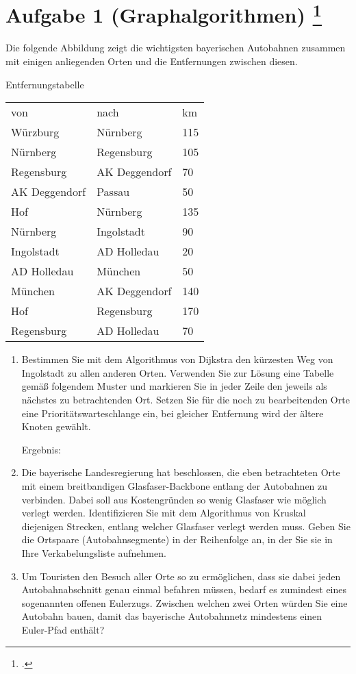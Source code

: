 \documentclass{lehramt-informatik-aufgabe}
\begin{document}
\section{Aufgabe 1 (Graphalgorithmen)
\footcite{66115:2017:03}}

Die folgende Abbildung zeigt die wichtigsten bayerischen Autobahnen
zusammen mit einigen anliegenden Orten und die Entfernungen zwischen
diesen.

Entfernungstabelle

\begin{tabular}{lll}
von & nach & km\\
Würzburg & Nürnberg & 115\\
Nürnberg & Regensburg & 105\\
Regensburg & AK Deggendorf & 70\\
AK Deggendorf & Passau & 50\\
Hof & Nürnberg & 135\\
Nürnberg & Ingolstadt & 90\\
Ingolstadt & AD Holledau & 20\\
AD Holledau & München & 50\\
München & AK Deggendorf & 140\\
Hof & Regensburg & 170\\
Regensburg & AD Holledau & 70\\
\end{tabular}

\begin{enumerate}


\item Bestimmen Sie mit dem Algorithmus von Dijkstra den kürzesten Weg
von Ingolstadt zu allen anderen Orten. Verwenden Sie zur Lösung eine
Tabelle gemäß folgendem Muster und markieren Sie in jeder Zeile den
jeweils als nächstes zu betrachtenden Ort. Setzen Sie für die noch zu
bearbeitenden Orte eine Prioritätswarteschlange ein, \dh bei gleicher
Entfernung wird der ältere Knoten gewählt.

Ergebnis:


\item Die bayerische Landesregierung hat beschlossen, die eben
betrachteten Orte mit einem breitbandigen Glasfaser-Backbone entlang der
Autobahnen zu verbinden. Dabei soll aus Kostengründen so wenig Glasfaser
wie möglich verlegt werden. Identifizieren Sie mit dem Algorithmus von
Kruskal diejenigen Strecken, entlang welcher Glasfaser verlegt werden
muss. Geben Sie die Ortspaare (Autobahnsegmente) in der Reihenfolge an,
in der Sie sie in Ihre Verkabelungsliste aufnehmen.

\item Um Touristen den Besuch aller Orte so zu ermöglichen, dass sie
dabei jeden Autobahnabschnitt genau einmal befahren müssen, bedarf es
zumindest eines sogenannten offenen Eulerzugs. Zwischen welchen zwei
Orten würden Sie eine Autobahn bauen, damit das bayerische Autobahnnetz
mindestens einen Euler-Pfad enthält?
\end{enumerate}
\end{document}
